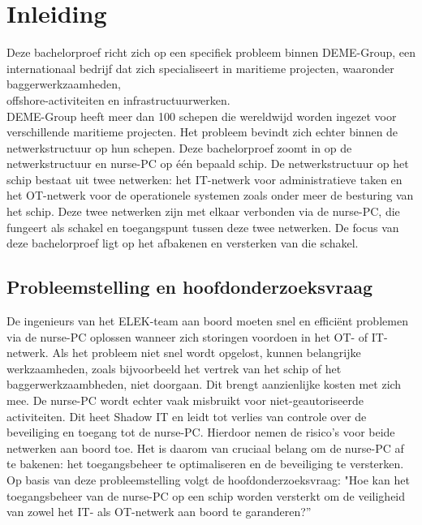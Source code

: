


% 

\section{Inleiding}%
\label{sec:inleiding}
Deze bachelorproef richt zich op een specifiek probleem binnen DEME-Group, een internationaal bedrijf dat zich specialiseert in maritieme projecten, waaronder 
baggerwerkzaamheden, \\offshore-activiteiten en infrastructuurwerken. \\DEME-Group heeft meer dan 100 schepen die wereldwijd worden ingezet voor verschillende maritieme projecten. Het probleem 
bevindt zich echter binnen de netwerkstructuur op hun schepen. Deze bachelorproef zoomt in op de netwerkstructuur en nurse-PC op één bepaald schip. De netwerkstructuur op het schip bestaat uit twee netwerken: het IT-netwerk voor administratieve taken 
en het OT-netwerk voor de operationele systemen zoals onder meer de besturing van het schip. Deze twee netwerken zijn met elkaar verbonden via de nurse-PC, 
die fungeert als schakel en toegangspunt tussen deze twee netwerken. De focus van deze bachelorproef ligt op het afbakenen en versterken van die schakel.

\subsection{Probleemstelling en hoofdonderzoeksvraag}
De ingenieurs van het ELEK-team aan boord moeten snel en efficiënt problemen via de nurse-PC oplossen wanneer zich storingen voordoen in het OT- of  IT-netwerk.  
Als het probleem niet snel wordt opgelost, kunnen belangrijke werkzaamheden, zoals bijvoorbeeld het vertrek van het schip of het baggerwerkzaambheden, niet doorgaan. 
Dit brengt aanzienlijke kosten met zich mee. De nurse-PC wordt echter vaak misbruikt voor niet-geautoriseerde activiteiten. Dit heet Shadow IT en leidt tot verlies van controle 
over de beveiliging en toegang tot de nurse-PC.  Hierdoor nemen de risico’s voor beide netwerken aan boord toe. Het is daarom van cruciaal belang om de nurse-PC af 
te bakenen: het toegangsbeheer te optimaliseren en de beveiliging te versterken. Op basis van deze probleemstelling volgt de hoofdonderzoeksvraag: 
"Hoe kan het toegangsbeheer van de nurse-PC op een schip worden versterkt om de veiligheid van zowel het IT- als OT-netwerk aan boord te garanderen?” 

